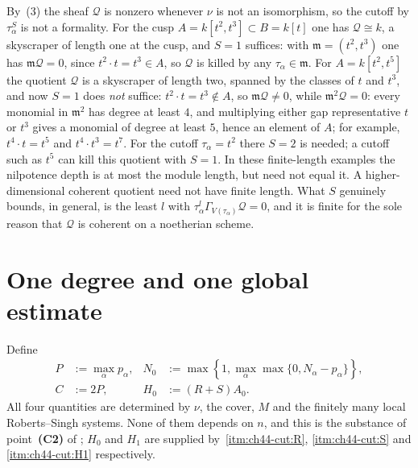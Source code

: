 \begin{remark}
\label{rem:ch44-Q-size}
By \,(3) the sheaf
$\mathcal Q$ is nonzero whenever $\nu$ is not an isomorphism, so the
cutoff by $\tau_\alpha^S$ is not a formality.  For the cusp
$A=k[t^2,t^3]\subset B=k[t]$ one has $\mathcal Q\cong k$, a skyscraper of
length one at the cusp, and $S=1$ suffices: with
$\mathfrak m=(t^2,t^3)$ one has
$\mathfrak m\mathcal Q=0$, since $t^2\cdot t=t^3\in A$, so
$\mathcal Q$ is killed by any $\tau_\alpha\in\mathfrak m$.  For
$A=k[t^2,t^5]$ the quotient $\mathcal Q$ is a skyscraper of length two,
spanned by the classes of $t$ and $t^3$, and now $S=1$ does
\emph{not} suffice: $t^2\cdot t=t^3\notin A$, so
$\mathfrak m\mathcal Q\ne0$, while
$\mathfrak m^2\mathcal Q=0$: every monomial in $\mathfrak m^2$ has degree
at least $4$, and multiplying either gap representative $t$ or $t^3$
gives a monomial of degree at least $5$, hence an element of $A$; for
example, $t^4\cdot t=t^5$ and $t^4\cdot t^3=t^7$.  For the cutoff $\tau_\alpha=t^2$ there $S=2$ is needed; a cutoff
such as $t^5$ can kill this quotient with $S=1$.
In these finite-length examples the nilpotence depth is at most the
module length, but need not equal it.  A higher-dimensional coherent
quotient need not have finite length.  What
$S$ genuinely bounds, in general, is the least $l$ with
$\tau_\alpha^l\Gamma_{V(\tau_\alpha)}\mathcal Q=0$, and it is finite for
the sole reason that $\mathcal Q$ is coherent on a noetherian scheme.
\end{remark}

\section{One degree and one global estimate}
\label{sec:ch44-global-sandwich}

Define
\[
 \begin{aligned}
 P&:=\max_\alpha p_\alpha,
 &N_0&:=\max\!\left\{1,\max_\alpha\max\{0,N_\alpha-p_\alpha\}\right\},\\
 C&:=2P,
 &H_0&:=(R+S)A_0.
 \end{aligned}
\tag{44.20}\label{eq:bj-char-zero-global-constants}
\]
All four quantities are determined by $\nu$, the cover, $M$ and the
finitely many local Roberts--Singh systems.  None of them depends on $n$,
and this is the substance of point~\textbf{(C2)} of ;
$H_0$ and $H_1$ are supplied by
\,\cref{itm:ch44-cut:R},
\cref{itm:ch44-cut:S} and \cref{itm:ch44-cut:H1} respectively.

